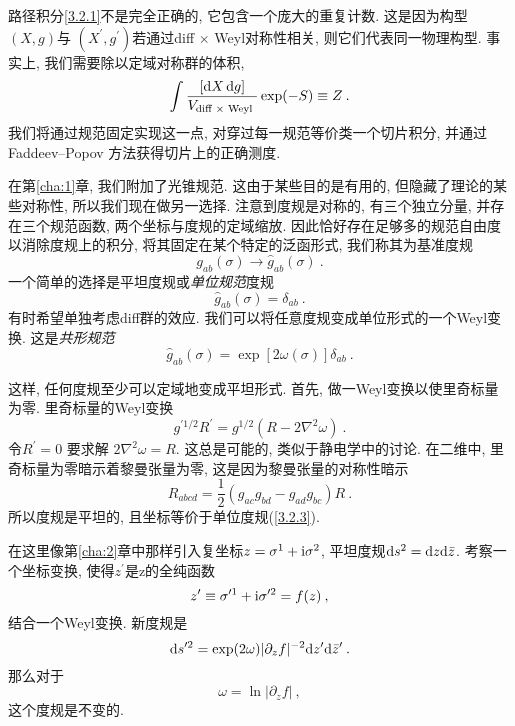 路径积分\eqref{3.2.1}不是完全正确的, 它包含一个庞大的重复计数. 这是因为构型$(X, g)$与 $(X^{\prime}, g^{\prime})$若通过diff $\times$ Weyl对称性相关, 则它们代表同一物理构型. 事实上, 我们需要除以定域对称群的体积,
\begin{equation}\label{3.3.1}
\int \frac{[\mathrm{d} X\, \mathrm{d} g]}{V_{\text {diff } \times \text { Weyl }}} \exp (-S) \equiv Z \:.
\end{equation}
我们将通过规范固定实现这一点, 对穿过每一规范等价类一个切片积分, 并通过 Faddeev--Popov 方法获得切片上的正确测度.


在第\ref{cha:1}章, 我们附加了光锥规范.  这由于某些目的是有用的, 但隐藏了理论的某些对称性, 所以我们现在做另一选择. 注意到度规是对称的, 有三个独立分量, 并存在三个规范函数, 两个坐标与度规的定域缩放. 因此恰好存在足够多的规范自由度以消除度规上的积分, 将其固定在某个特定的泛函形式, 我们称其为基准度规
\begin{equation}
g_{a b}(\sigma) \rightarrow \hat{g}_{a b}(\sigma) \:. \label{3.3.2}
\end{equation}
一个简单的选择是平坦度规或\emph{单位规范}度规
\begin{equation}\label{3.3.3}
\hat{g}_{a b}(\sigma)=\delta_{a b} \:. 
\end{equation}
有时希望单独考虑diff群的效应. 我们可以将任意度规变成单位形式的一个Weyl变换. 这是\emph{共形规范}
\begin{equation}
\hat{g}_{a b}(\sigma)=\exp [2 \omega(\sigma)] \delta_{a b} \:. \label{3.3.4}
\end{equation}

这样, 任何度规至少可以定域地变成平坦形式. 首先, 做一Weyl变换以使里奇标量为零. 里奇标量的Weyl变换
\begin{equation}\label{3.3.5}
g^{\prime 1 / 2} R^{\prime}=g^{1 / 2}\left(R-2 \nabla^{2} \omega\right) \:.
\end{equation}
令$R^{\prime}=0$ 要求解 $2 \nabla^{2} \omega=R$. 这总是可能的, 类似于静电学中的讨论. 在二维中, 里奇标量为零暗示着黎曼张量为零, 这是因为黎曼张量的对称性暗示
\begin{equation}
R_{a b c d}=\frac{1}{2}(g_{a c} g_{b d}-g_{a d} g_{b c}) R  \:. \label{3.3.6}
\end{equation}
所以度规是平坦的, 且坐标等价于单位度规(\ref{3.2.3}).

在这里像第\ref{cha:2}章中那样引入复坐标$z=\sigma^{1}+\mathrm{i} \sigma^{2}$, 平坦度规$\mathrm{d} s^{2}=\mathrm{d} z \mathrm{d} \bar{z}$. 考察一个坐标变换, 使得$z^\prime$是z的全纯函数
\begin{equation}\label{3.3.7}
z^{\prime} \equiv \sigma^{\prime 1}+\mathrm{i} \sigma^{\prime 2}=f(z) \:, 
\end{equation}
结合一个Weyl变换. 新度规是
\begin{equation}
\mathrm{d} s^{\prime 2}=\exp (2 \omega)\lvert\partial_{z} f\rvert^{-2} \mathrm{d} z^{\prime} \mathrm{d} \bar{z}^{\prime} \:. \label{3.3.8}
\end{equation}
那么对于
\begin{equation}\label{3.3.9}
\omega=\ln \lvert\partial_{z} f\rvert \:,
\end{equation}
这个度规是不变的. %


